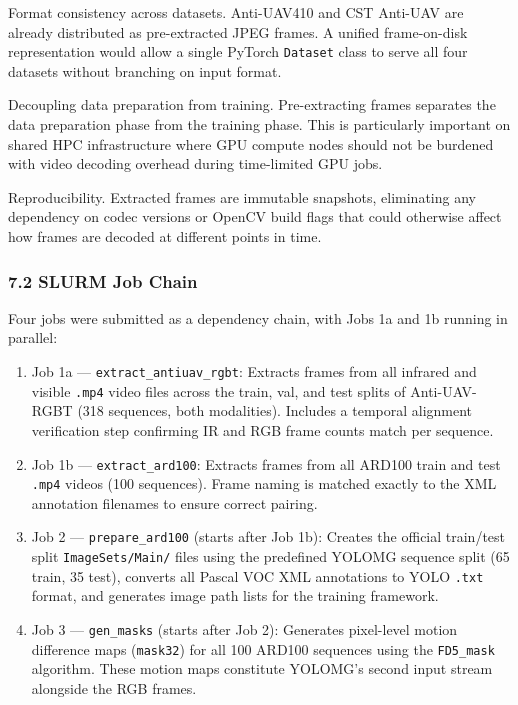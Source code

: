 Format consistency across datasets. Anti-UAV410 and CST
Anti-UAV are already distributed as pre-extracted JPEG frames. A
unified frame-on-disk representation would allow a single PyTorch
\texttt{Dataset} class to serve all four datasets without
branching on input format.

Decoupling data preparation from training. Pre-extracting
frames separates the data preparation phase from the training phase.
This is particularly important on shared HPC infrastructure where
GPU compute nodes should not be burdened with video decoding overhead
during time-limited GPU jobs.

Reproducibility. Extracted frames are immutable snapshots,
eliminating any dependency on codec versions or OpenCV build flags
that could otherwise affect how frames are decoded at different
points in time.

\subsubsection*{7.2 SLURM Job Chain}

Four jobs were submitted as a dependency chain, with Jobs 1a and 1b
running in parallel:

\begin{enumerate}
    \item Job 1a --- \texttt{extract\_antiuav\_rgbt}: Extracts
          frames from all infrared and visible \texttt{.mp4} video files
          across the train, val, and test splits of Anti-UAV-RGBT
          (318 sequences, both modalities). Includes a temporal alignment
          verification step confirming IR and RGB frame counts match per
          sequence.
    \item Job 1b --- \texttt{extract\_ard100}: Extracts frames
          from all ARD100 train and test \texttt{.mp4} videos (100
          sequences). Frame naming is matched exactly to the XML
          annotation filenames to ensure correct pairing.
    \item Job 2 --- \texttt{prepare\_ard100} (starts after Job
          1b): Creates the official train/test split
          \texttt{ImageSets/Main/} files using the predefined YOLOMG
          sequence split (65 train, 35 test), converts all Pascal VOC
          XML annotations to YOLO \texttt{.txt} format, and generates
          image path lists for the training framework.
    \item Job 3 --- \texttt{gen\_masks} (starts after Job 2):
          Generates pixel-level motion difference maps (\texttt{mask32})
          for all 100 ARD100 sequences using the \texttt{FD5\_mask}
          algorithm. These motion maps constitute YOLOMG's second input
          stream alongside the RGB frames.
\end{enumerate}

